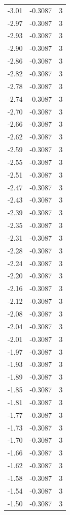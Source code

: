 \begin{longtable}{lrr}
  -3.01 & -0.3087 & 3 \\
  -2.97 & -0.3087 & 3 \\
  -2.93 & -0.3087 & 3 \\
  -2.90 & -0.3087 & 3 \\
  -2.86 & -0.3087 & 3 \\
  -2.82 & -0.3087 & 3 \\
  -2.78 & -0.3087 & 3 \\
  -2.74 & -0.3087 & 3 \\
  -2.70 & -0.3087 & 3 \\
  -2.66 & -0.3087 & 3 \\
  -2.62 & -0.3087 & 3 \\
  -2.59 & -0.3087 & 3 \\
  -2.55 & -0.3087 & 3 \\
  -2.51 & -0.3087 & 3 \\
  -2.47 & -0.3087 & 3 \\
  -2.43 & -0.3087 & 3 \\
  -2.39 & -0.3087 & 3 \\
  -2.35 & -0.3087 & 3 \\
  -2.31 & -0.3087 & 3 \\
  -2.28 & -0.3087 & 3 \\
  -2.24 & -0.3087 & 3 \\
  -2.20 & -0.3087 & 3 \\
  -2.16 & -0.3087 & 3 \\
  -2.12 & -0.3087 & 3 \\
  -2.08 & -0.3087 & 3 \\
  -2.04 & -0.3087 & 3 \\
  -2.01 & -0.3087 & 3 \\
  -1.97 & -0.3087 & 3 \\
  -1.93 & -0.3087 & 3 \\
  -1.89 & -0.3087 & 3 \\
  -1.85 & -0.3087 & 3 \\
  -1.81 & -0.3087 & 3 \\
  -1.77 & -0.3087 & 3 \\
  -1.73 & -0.3087 & 3 \\
  -1.70 & -0.3087 & 3 \\
  -1.66 & -0.3087 & 3 \\
  -1.62 & -0.3087 & 3 \\
  -1.58 & -0.3087 & 3 \\
  -1.54 & -0.3087 & 3 \\
  -1.50 & -0.3087 & 3 \\

\end{longtable}
